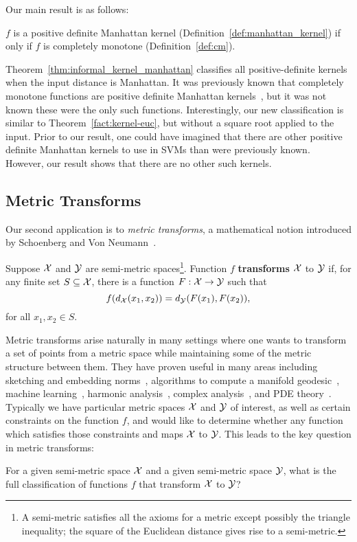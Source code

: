  Our main result is as follows:
\begin{theorem} \label{thm:informal_kernel_manhattan} 
$f$ is a positive definite Manhattan kernel (Definition~\ref{def:manhattan_kernel}) if only if $f$ is completely monotone (Definition~\ref{def:cm}).
\end{theorem}

Theorem~\ref{thm:informal_kernel_manhattan} classifies all positive-definite kernels when the input distance is Manhattan. It was previously known that completely monotone functions are positive definite Manhattan kernels~\cite{s38, a80}, but it was not known these were the only such functions. Interestingly, our new classification is similar to Theorem~\ref{fact:kernel-euc}, but without a square root applied to the input. Prior to our result, one could have imagined that there are other positive definite Manhattan kernels to use in SVMs than were previously known. However, our result shows that there are no other such kernels.





\subsection{Metric Transforms} \label{sec:metric}


Our second application is to \emph{metric transforms}, a mathematical notion introduced by Schoenberg and Von Neumann~\cite{ns41}. 

\begin{definition}\label{def:metric-transform}
Suppose ${\cal X}$ and ${\cal Y}$ are semi-metric spaces\footnote{A semi-metric satisfies all the axioms for a metric except possibly the triangle inequality; the square of the Euclidean distance gives rise to a semi-metric.}. Function $f$ \textbf{transforms} ${\cal X}$ to ${\cal Y}$ if, for any finite set $S \subseteq {\cal X}$, there is a function $F: {\cal X} \to {\cal Y}$ such that
\[f(d_{{\cal X}}(x_1,x_2)) = d_{{\cal Y}}(F(x_1), F(x_2)) ,
\]
for all $x_1, x_2 \in S$.
 \end{definition}
 Metric transforms arise naturally in many settings where one wants to transform a set of points from a metric space while maintaining some of the metric structure between them. They have proven useful in many areas including 
 sketching and embedding norms~\cite{akr15}, algorithms to compute a manifold geodesic~\cite{cms20}, machine learning~\cite{o96, ssb+97}, harmonic analysis~\cite{a50,lllh18,kw71}, complex analysis~\cite{a50}, and PDE theory~\cite{fs98, cfw12}. Typically we have particular metric spaces ${\cal X}$ and ${\cal Y}$ of interest, as well as certain constraints on the function $f$, and would like to determine whether any function which satisfies those constraints and maps ${\cal X}$ to ${\cal Y}$. This leads to the key question in metric transforms: 
 \begin{question}For a given semi-metric space ${\cal X}$ and a given semi-metric space ${\cal Y}$, what is the full classification of functions $f$ that transform ${\cal X}$ to ${\cal Y}$?\end{question}
 
